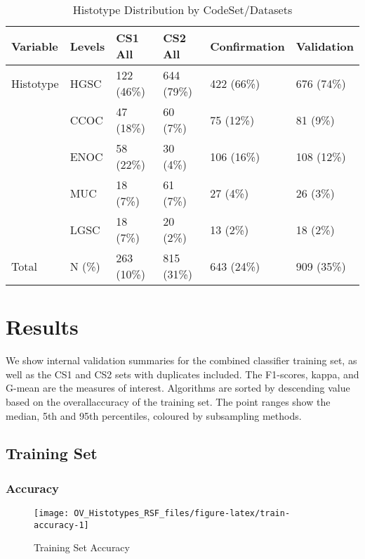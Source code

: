 \documentclass[
]{report}
\begin{document}
\begin{table}

\caption{\label{tab:hist-codeset-dataset}Histotype Distribution by CodeSet/Datasets}
\centering
\begin{tabular}[t]{l|l|l|l|l|l}
\hline
Variable & Levels & CS1 All & CS2 All & Confirmation & Validation\\
\hline
Histotype & HGSC & 122 (46\%) & 644 (79\%) & 422 (66\%) & 676 (74\%)\\
\hline
 & CCOC & 47 (18\%) & 60 (7\%) & 75 (12\%) & 81 (9\%)\\
\hline
 & ENOC & 58 (22\%) & 30 (4\%) & 106 (16\%) & 108 (12\%)\\
\hline
 & MUC & 18 (7\%) & 61 (7\%) & 27 (4\%) & 26 (3\%)\\
\hline
 & LGSC & 18 (7\%) & 20 (2\%) & 13 (2\%) & 18 (2\%)\\
\hline
Total & N (\%) & 263 (10\%) & 815 (31\%) & 643 (24\%) & 909 (35\%)\\
\hline
\end{tabular}
\end{table}

\hypertarget{results}{%
\chapter{Results}\label{results}}

We show internal validation summaries for the combined classifier training set, as well as the CS1 and CS2 sets with duplicates included. The F1-scores, kappa, and G-mean are the measures of interest. Algorithms are sorted by descending value based on the overallaccuracy of the training set. The point ranges show the median, 5th and 95th percentiles, coloured by subsampling methods.

\hypertarget{training-set-1}{%
\section{Training Set}\label{training-set-1}}

\hypertarget{accuracy}{%
\subsection{Accuracy}\label{accuracy}}

\begin{figure}[H]

{\centering \texttt{[image: OV\_Histotypes\_RSF\_files/figure-latex/train-accuracy-1]} 

}

\caption{Training Set Accuracy}\label{fig:train-accuracy}
\end{figure}
\end{document}

